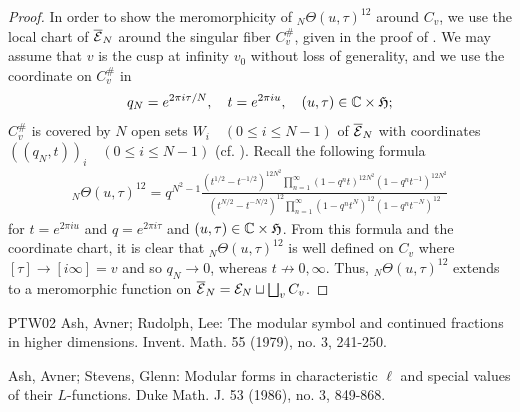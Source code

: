 \documentclass[12pt,amstex,amssymb]{article}
\theoremstyle{plain}
\theoremstyle{definition}
\def\cE{{\cal E}}
\def\fH{{\frak H}}
\def\Z{{\mathbb Z}}
\def\C{{\mathbb C}}
\begin{document}
{\begin{proof}
    In order to show the meromorphicity of $_{N}\!\Theta(u,\tau)^{12}$ around $C_v$, we use the local chart of $\overline \cE_N$ around the singular fiber $C_v^\#$, given in the proof of \cite[Theorem 5.5]{Shioda}. We may assume that $v$ is the cusp at infinity $v_0$ without loss of generality, and we use the coordinate on $C_v^\#$ in \cite[p. 39]{Shioda}
    \begin{eqnarray*}
        q_N=e^{2 \pi i \tau/N}, \quad t= e^{2 \pi i u}, \quad (u, \tau) \in \C \times \fH;
    \end{eqnarray*}
    $C_v^\#$ is covered by $N$ open sets $W_i \quad (0 \leq i \leq N-1)$ of $\overline \cE_N$ with coordinates $((q_N, t))_i \quad (0 \leq i \leq N-1)$ (cf. \cite[p. 597-600]{Kodaira}). 
    Recall the following formula
        \begin{eqnarray*}
           _{N}\!\Theta(u,\tau)^{12}=q^{N^2-1} \frac{(t^{1/2} - t^{-1/2})^{12N^2} \prod_{n=1}^\infty \left(1 - q^nt\right)^{12N^2} \left(1 - q^nt^{-1}\right)^{12N^2}}{ (t^{N/2} - t^{-N/2})^{12} \prod_{n=1}^\infty \left(1 - q^n t^{N}\right)^{12}\left(1 - q^nt^{-N}\right)^{12}}
        \end{eqnarray*}
        for $t=e^{2 \pi i u}$ and $q=e^{2 \pi i \tau}$ and $(u,\tau) \in \C\times \fH$. 
         From this formula and the coordinate chart, it is clear that $_{N}\!\Theta(u,\tau)^{12}$ is well defined on $C_v$ where $[\tau] \to [i \infty]=v$ and so $q_N \to 0$, whereas $t\not\to 0, \infty$. Thus, $_{N}\!\Theta(u,\tau)^{12}$ extends to a meromorphic function on $\overline\cE_N=\cE_N \sqcup \bigsqcup_{v}C_v$. 
    \end{proof}
   




\begin{thebibliography}{PTW02} %
Ash, Avner; Rudolph, Lee: The modular symbol and continued fractions in higher dimensions. Invent. Math. 55 (1979), no. 3, 241-250.


Ash, Avner; Stevens, Glenn: Modular forms in characteristic $\ell$ and special values of their $L$-functions. Duke Math. J. 53 (1986), no. 3, 849-868.


\end{thebibliography}}
\end{document}
